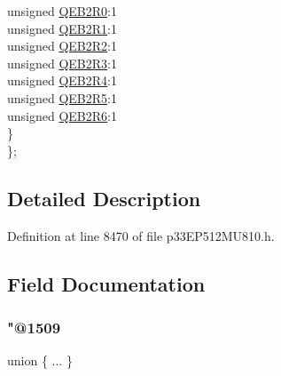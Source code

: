\begin{DoxyCompactItemize}
\begin{tabbing}
\>\>unsigned \hyperlink{structtag_r_p_i_n_r16_b_i_t_s_a187ca26c45dc053b40d77ea44cccb999}{QEB2R0}:1\\
\>\>unsigned \hyperlink{structtag_r_p_i_n_r16_b_i_t_s_ac02e9a86fd37a867f3c8ae174d8182a9}{QEB2R1}:1\\
\>\>unsigned \hyperlink{structtag_r_p_i_n_r16_b_i_t_s_a78bfd1eb539f5f53a8be38ae4099742e}{QEB2R2}:1\\
\>\>unsigned \hyperlink{structtag_r_p_i_n_r16_b_i_t_s_adc7a50f5f0185d52a7532466293bec22}{QEB2R3}:1\\
\>\>unsigned \hyperlink{structtag_r_p_i_n_r16_b_i_t_s_a4a51b3d0832d54f59e63abb8feeb49c9}{QEB2R4}:1\\
\>\>unsigned \hyperlink{structtag_r_p_i_n_r16_b_i_t_s_a76338099d300605919dbbb4abaac6e76}{QEB2R5}:1\\
\>\>unsigned \hyperlink{structtag_r_p_i_n_r16_b_i_t_s_abff287f2e6531637a99cfa3efab3c7c8}{QEB2R6}:1\\
\>\} \\
\}; \\

\end{tabbing}\end{DoxyCompactItemize}


\subsection{Detailed Description}


Definition at line 8470 of file p33\+E\+P512\+M\+U810.\+h.



\subsection{Field Documentation}
\mbox{\label{structtag_r_p_i_n_r16_b_i_t_s_a66097850e795c5e8a91ebf2ca3067fe0}} 
\subsubsection{\texorpdfstring{"@1509}{@1509}}
{\footnotesize\ttfamily union \{ ... \} }

\mbox{\label{structtag_r_p_i_n_r16_b_i_t_s_adf71f3d8410c1f1dbbc96680a92c49af}} 
